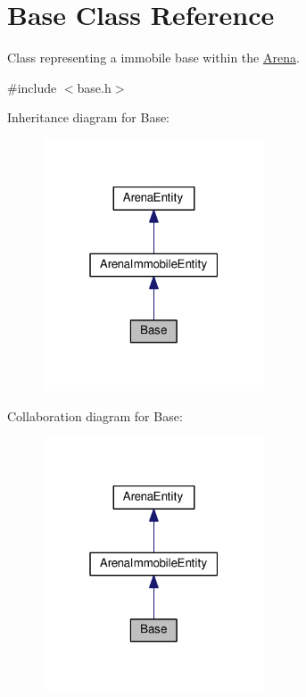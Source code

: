 \hypertarget{classBase}{}\section{Base Class Reference}
\label{classBase}


Class representing a immobile base within the \hyperlink{classArena}{Arena}.  




{\ttfamily \#include $<$base.\+h$>$}



Inheritance diagram for Base\+:\nopagebreak
\begin{figure}[H]
\begin{center}
\leavevmode
\includegraphics[width=187pt]{classBase__inherit__graph}
\end{center}
\end{figure}


Collaboration diagram for Base\+:\nopagebreak
\begin{figure}[H]
\begin{center}
\leavevmode
\includegraphics[width=187pt]{classBase__coll__graph}
\end{center}
\end{figure}

